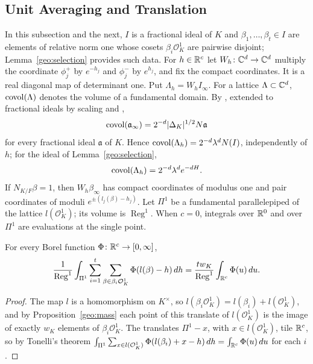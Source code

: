 \subsection{Unit Averaging and Translation}
In this subsection and the next, $I$ is a fractional ideal of $K$ and
$\beta_1,\dots,\beta_t\in I$ are elements of relative norm one whose
cosets $\beta_i\mathcal O_K^1$ are pairwise disjoint;
Lemma~\ref{geo:selection} provides such data. For $h\in\mathbb R^c$ let
$W_h\colon\mathbb C^d\to\mathbb C^d$ multiply the coordinate $\phi_j^+$ by
$e^{-h_j}$ and $\phi_j^-$ by $e^{h_j}$, and fix the compact
coordinates. It is a real diagonal map of determinant one. Put
$\Lambda_h=W_hI_\infty$. For a lattice $\Lambda\subset\mathbb C^d$,
$\operatorname{covol}(\Lambda)$ denotes the volume of a fundamental domain. By
\cite[Proposition~4.26]{MilneANT}, extended to fractional ideals by
scaling and \cite[Proposition~4.2]{MilneANT},
\begin{equation}\label{geo:covolume}
 \operatorname{covol}(\mathfrak a_\infty)=2^{-d}|\Delta_K|^{1/2}N\mathfrak a
\end{equation}
for every fractional ideal $\mathfrak a$ of $K$. Hence
$\operatorname{covol}(\Lambda_h)=2^{-d}\lambda^dN(I)$, independently of $h$; for the
ideal of Lemma~\ref{geo:selection},
\begin{equation}\label{geo:determinant}
 \operatorname{covol}(\Lambda_h)=2^{-d}\lambda^de^{-dH}.
\end{equation}
If $N_{K/F}\beta=1$, then $W_h\beta_\infty$ has compact coordinates of
modulus one and pair coordinates of moduli $e^{\pm(l_j(\beta)-h_j)}$.
Let $\Pi^1$ be a fundamental parallelepiped of the lattice
$l(\mathcal O_K^1)$; its volume is $\operatorname{Reg}^1$. When $c=0$,
integrals over $\mathbb R^0$ and over $\Pi^1$ are evaluations at the single
point.

\begin{lemma}\label{geo:unfold-lemma}
For every Borel function $\Phi\colon\mathbb R^c\to[0,\infty]$,
\begin{equation}\label{geo:unfold}
 \frac1{\operatorname{Reg}^1}\int_{\Pi^1}\sum_{i=1}^t
 \sum_{\beta\in\beta_i\mathcal O_K^1}\Phi(l(\beta)-h)\,dh
 =\frac{tw_K}{\operatorname{Reg}^1}\int_{\mathbb R^c}\Phi(u)\,du .
\end{equation}
\end{lemma}

\begin{proof}
The map $l$ is a homomorphism on $K^\times$, so
$l(\beta_i\mathcal O_K^1)=l(\beta_i)+l(\mathcal O_K^1)$, and by
Proposition~\ref{geo:mass} each point of this translate of
$l(\mathcal O_K^1)$ is the image of exactly $w_K$ elements of
$\beta_i\mathcal O_K^1$. The translates $\Pi^1-x$, with
$x\in l(\mathcal O_K^1)$, tile $\mathbb R^c$, so by Tonelli's theorem
$\int_{\Pi^1}\sum_{x\in l(\mathcal
O_K^1)}\Phi(l(\beta_i)+x-h)\,dh=\int_{\mathbb R^c}\Phi(u)\,du$ for each
$i$.
\end{proof}

